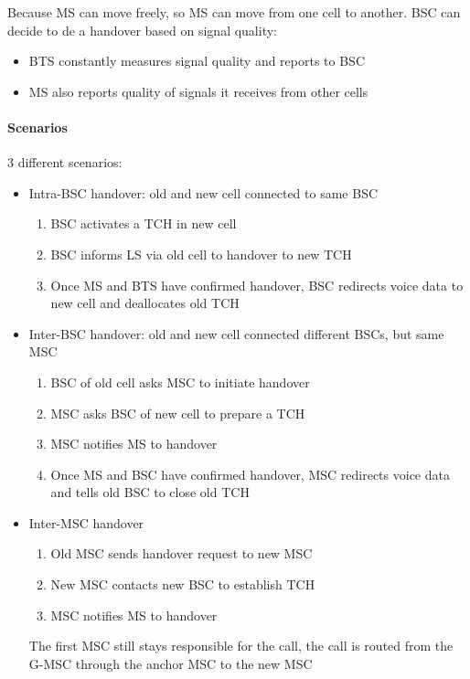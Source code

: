 Because MS can move freely, so MS can move from one cell to
another. BSC can decide to de a handover based on signal quality:

\begin{itemize}
	\item BTS constantly measures signal quality and reports to BSC
	\item MS also reports quality of signals it receives from other cells
\end{itemize}

\paragraph{Scenarios} 3 different scenarios:
\begin{itemize}
	\item Intra-BSC handover: old and new cell connected to same BSC
	\begin{enumerate}
		\item BSC activates a TCH in new cell
		\item BSC informs LS via old cell to handover to new TCH
		\item Once MS and BTS have confirmed handover, BSC redirects
		voice data to new cell and deallocates old TCH
	\end{enumerate}

	\item Inter-BSC handover: old and new cell connected different BSCs,
	but same MSC
	\begin{enumerate}
		\item BSC of old cell asks MSC to initiate handover
		\item MSC asks BSC of new cell to prepare a TCH
		\item MSC notifies MS to handover
		\item Once MS and BSC have confirmed handover, MSC redirects voice
		data and tells old BSC to close old TCH
	\end{enumerate}

	\item Inter-MSC handover
	\begin{enumerate}
		\item Old MSC sends handover request to new MSC
		\item New MSC contacts new BSC to establish TCH
		\item MSC notifies MS to handover
	\end{enumerate}
	The first MSC still stays responsible for the call, the call is routed from
	the G-MSC through the anchor MSC to the new MSC
\end{itemize}

